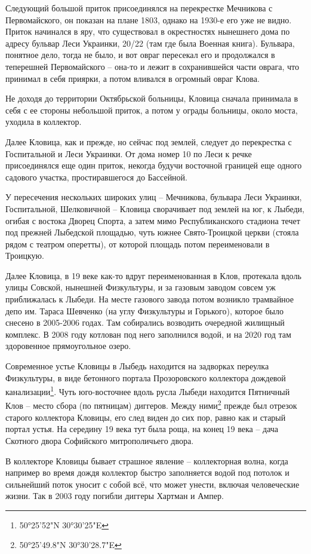 Следующий большой приток присоединялся на перекрестке Мечникова с Первомайского, он показан на плане 1803, однако на 1930-е его уже не видно. Приток начинался в яру, что существовал в окрестностях нынешнего дома по адресу бульвар Леси Украинки, 20/22 (там где была Военная книга). Бульвара, понятное дело, тогда не было, и вот овраг пересекал его и продолжался в теперешней Первомайского – она-то и лежит в сохранившейся части оврага, что принимал в себя приярки, а потом вливался в огромный овраг Клова.

Не доходя до территории Октябрьской больницы, Кловица сначала принимала в себя с ее стороны небольшой приток, а потом у ограды больницы, около моста, уходила в коллектор.

Далее Кловица, как и прежде, но сейчас под землей, следует до перекрестка с Госпитальной и Леси Украинки. От дома номер 10 по Леси к речке присоединялся еще один приток, некогда будучи восточной границей еще одного садового участка, простиравшегося до Бассейной.

У пересечения нескольких широких улиц – Мечникова, бульвара Леси Украинки, Госпитальной, Шелковичной – Кловица сворачивает под землей на юг, к Лыбеди, огибая с востока Дворец Спорта, а затем мимо Республиканского стадиона течет под прежней Лыбедской площадью, чуть южнее Свято-Троицкой церкви (стояла рядом с театром оперетты), от которой площадь потом переименовали в Троицкую.

Далее Кловица, в 19 веке как-то вдруг переименованная в Клов, протекала вдоль улицы Совской, нынешней Физкультуры, и за газовым заводом совсем уж приближалась к Лыбеди. На месте газового завода потом возникло трамвайное депо им. Тараса Шевченко (на углу Физкультуры и Горького), которое было снесено в 2005-2006 годах. Там собирались возводить очередной жилищный комплекс. В 2008 году котлован под него заполнился водой, и на 2020 год там здоровенное прямоугольное озеро.

Современное устье Кловицы в Лыбедь находится на задворках переулка Физкультуры, в виде бетонного портала Прозоровского коллектора дождевой канализации\footnote{50°25'52"N 30°30'25"E}. Чуть юго-восточнее вдоль русла Лыбеди находится Пятничный Клов – место сбора (по пятницам) диггеров. Между ними\footnote{50°25'49.8"N 30°30'28.7"E} прежде был отрезок старого коллектора Кловицы, его след виден до сих пор, равно как и старый портал устья. На середину 19 века тут была роща, на конец 19 века – дача Скотного двора Софийского митрополичьего двора.

В коллекторе Кловицы бывает страшное явление – коллекторная волна, когда например во время дождя коллектор быстро заполняется водой под потолок и сильнейший поток уносит с собой всё, что может унести, включая человеческие жизни. Так в 2003 году погибли диггеры Хартман и Ампер.

